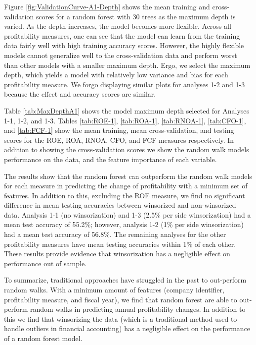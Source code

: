 Figure \ref{fig:ValidationCurve-A1-Depth} shows the mean training and cross-validation scores for a random forest with 30 trees as the maximum depth is varied.  As the depth increases, the model becomes more flexible. Across all profitability measures, one can see that the model can learn from the training data fairly well with high training accuracy scores. However, the highly flexible models cannot generalize well to the cross-validation data and perform worst than other models with a smaller maximum depth. Ergo, we select the maximum depth, which yields a model with relatively low variance and bias for each profitability measure. We forgo displaying similar plots for analyses 1-2 and 1-3 because the effect and accuracy scores are similar. 

Table \ref{tab:MaxDepthA1} shows the model maximum depth selected for Analyses 1-1, 1-2, and 1-3. Tables \ref{tab:ROE-1},  \ref{tab:ROA-1}, \ref{tab:RNOA-1}, \ref{tab:CFO-1}, and \ref{tab:FCF-1} show the mean training, mean cross-validation, and testing scores for the ROE, ROA, RNOA, CFO, and FCF measures respectively. In addition to showing the cross-validation scores we show the random walk models performance on the data,  and the feature importance of each variable. 

The results show that the random forest can outperform the random walk models for each measure in predicting the change of profitability with a minimum set of features. In addition to this, excluding the ROE measure, we find no significant difference in mean testing accuracies between winsorized and non-winsorized data. Analysis 1-1 (no winsorization) and 1-3 (2.5\% per side winsorization) had a mean test accuracy of 55.2\%; however, analysis 1-2 (1\% per side winsorization) had a mean test accuracy of 56.8\%. The remaining analyses for the other profitability measures have mean testing accuracies within 1\% of each other. These results provide evidence that winsorization has a negligible effect on performance out of sample.

To summarize,  traditional approaches have struggled in the past to out-perform random walks. With a minimum amount of features (company identifier, profitability measure, and fiscal year), we find that random forest are able to out-perform random walks in predicting annual profitability changes. In addition to this we find that winsorizing the data (which is a traditional method used to handle outliers in financial accounting) has a negligible effect on the performance of a random forest model.

